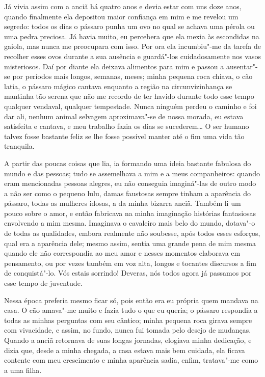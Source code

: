  Já vivia assim com a anciã há quatro anos e devia estar com uns doze
anos, quando finalmente ela depositou maior confiança em mim e me
revelou um segredo: todos os dias o pássaro punha um ovo no qual se
achava uma pérola ou uma pedra preciosa. Já havia muito, eu percebera
que ela mexia às escondidas na gaiola, mas nunca me preocupara com
isso. Por ora ela incumbiu"-me da tarefa de recolher esses ovos durante
a sua ausência e guardá"-los cuidadosamente nos vasos misteriosos.
Daí por diante ela deixava alimentos para mim e passou a ausentar"-se
por períodos mais longos, semanas, meses; minha pequena roca chiava, o
cão latia, o pássaro mágico cantava enquanto a região na
circunvizinhança se mantinha tão serena que não me recordo de ter
havido durante todo esse tempo qualquer vendaval, qualquer tempestade.
Nunca ninguém perdeu o caminho e foi dar ali, nenhum animal selvagem
aproximava"-se de nossa morada, eu estava satisfeita e cantava, e meu
trabalho fazia os dias se sucederem\ldots{} O ser humano talvez fosse
bastante feliz se lhe fosse possível manter até o fim uma vida tão tranquila.

 A partir das poucas coisas que lia, ia formando uma ideia bastante
fabulosa do mundo e das pessoas; tudo se assemelhava a mim e a meus
companheiros: quando eram mencionadas pessoas alegres, eu não conseguia
imaginá"-las de outro modo a não ser como o pequeno lulu, damas
faustosas sempre tinham a aparência do pássaro, todas as mulheres
idosas, a da minha bizarra anciã. Também li um pouco sobre o amor, e
então fabricava na minha imaginação histórias fantasiosas envolvendo a
mim mesma. Imaginava o cavaleiro mais belo do mundo, dotava"-o de todas
as qualidades, embora realmente não soubesse, após todos esses
esforços, qual era a aparência dele; mesmo assim, sentia uma grande
pena de mim mesma quando ele não correspondia ao meu amor e nesses
momentos elaborava em pensamento, ou por vezes também em voz alta,
longos e tocantes discursos a fim de conquistá"-lo. Vós estais
sorrindo! Deveras, nós todos agora já passamos por esse tempo de juventude.

 Nessa época preferia mesmo ficar só, pois então era eu própria quem
mandava na casa. O cão amava"-me muito e fazia tudo o que eu queria; o
pássaro respondia a todas as minhas perguntas com seu cântico; minha
pequena roca  girava sempre com vivacidade, e assim, no fundo, nunca fui
tomada pelo desejo de mudanças. Quando a anciã retornava de suas
longas jornadas, elogiava minha dedicação, e dizia que, desde a minha
chegada, a casa estava mais bem cuidada, ela ficava contente com
meu crescimento e minha aparência sadia, enfim, tratava"-me como a uma filha.

